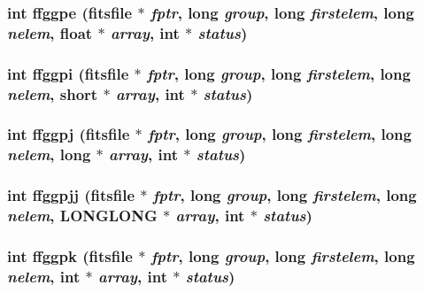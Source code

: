 \subsubsection{\setlength{\rightskip}{0pt plus 5cm}int ffggpe (\bf{fitsfile} $\ast$ {\em fptr}, long {\em group}, long {\em firstelem}, long {\em nelem}, float $\ast$ {\em array}, int $\ast$ {\em status})}\label{test_2shm__client_2fitsio_8h_5d09492332cbecfe94b123b8a0defeb9}


\subsubsection{\setlength{\rightskip}{0pt plus 5cm}int ffggpi (\bf{fitsfile} $\ast$ {\em fptr}, long {\em group}, long {\em firstelem}, long {\em nelem}, short $\ast$ {\em array}, int $\ast$ {\em status})}\label{test_2shm__client_2fitsio_8h_aeab60257fb251921567291948d553a2}


\subsubsection{\setlength{\rightskip}{0pt plus 5cm}int ffggpj (\bf{fitsfile} $\ast$ {\em fptr}, long {\em group}, long {\em firstelem}, long {\em nelem}, long $\ast$ {\em array}, int $\ast$ {\em status})}\label{test_2shm__client_2fitsio_8h_99232aa89514e1335fced48812badbd8}


\subsubsection{\setlength{\rightskip}{0pt plus 5cm}int ffggpjj (\bf{fitsfile} $\ast$ {\em fptr}, long {\em group}, long {\em firstelem}, long {\em nelem}, \bf{LONGLONG} $\ast$ {\em array}, int $\ast$ {\em status})}\label{test_2shm__client_2fitsio_8h_76b52ae73ab6d4139c2f8289663511c2}


\subsubsection{\setlength{\rightskip}{0pt plus 5cm}int ffggpk (\bf{fitsfile} $\ast$ {\em fptr}, long {\em group}, long {\em firstelem}, long {\em nelem}, int $\ast$ {\em array}, int $\ast$ {\em status})}\label{test_2shm__client_2fitsio_8h_09f7024b2b7c61b65c69753195f596e2}


